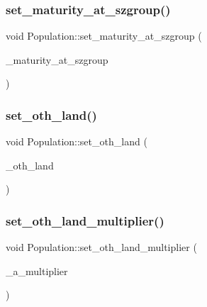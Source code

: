 \mbox{\label{class_population_acb3b8344976ea406a39a0125d3375d7e}} 
\subsubsection{\texorpdfstring{set\_maturity\_at\_szgroup()}{set\_maturity\_at\_szgroup()}}
{\footnotesize\ttfamily void Population\+::set\+\_\+maturity\+\_\+at\+\_\+szgroup (\begin{DoxyParamCaption}\item[{const vector$<$ double $>$ \&}]{\+\_\+maturity\+\_\+at\+\_\+szgroup }\end{DoxyParamCaption})}

\mbox{\label{class_population_a4cb661707a980ccb2ce2762af6028ecd}} 
\subsubsection{\texorpdfstring{set\_oth\_land()}{set\_oth\_land()}}
{\footnotesize\ttfamily void Population\+::set\+\_\+oth\+\_\+land (\begin{DoxyParamCaption}\item[{map$<$ \mbox{\hyperlink{classtypes_1_1_node_id}{types\+::\+Node\+Id}}, double $>$}]{\+\_\+oth\+\_\+land }\end{DoxyParamCaption})}

\mbox{\label{class_population_a6fa5538be71c4a81a2810d19c454f872}} 
\subsubsection{\texorpdfstring{set\_oth\_land\_multiplier()}{set\_oth\_land\_multiplier()}}
{\footnotesize\ttfamily void Population\+::set\+\_\+oth\+\_\+land\+\_\+multiplier (\begin{DoxyParamCaption}\item[{double}]{\+\_\+a\+\_\+multiplier }\end{DoxyParamCaption})}

